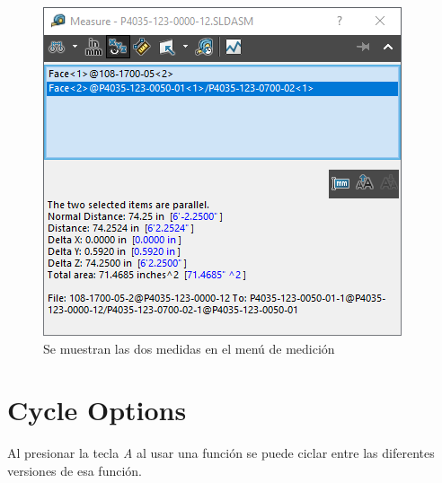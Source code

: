 \documentclass[12pt,letterpaper,final]{report}
\begin{document}
\begin{figure}[H]
	\centering
	\includegraphics[width=0.55\linewidth, height=0.35\textheight,keepaspectratio]{Imagenes/solidworks_dual_units03}
	\caption{Se muestran las dos medidas en el menú de medición}
	\label{fig:solidworksdualunits03}
\end{figure}


\chapter{Cycle Options}

Al presionar la tecla \emph{A} al usar una  función se puede ciclar entre las diferentes versiones de esa función.
\end{document}
